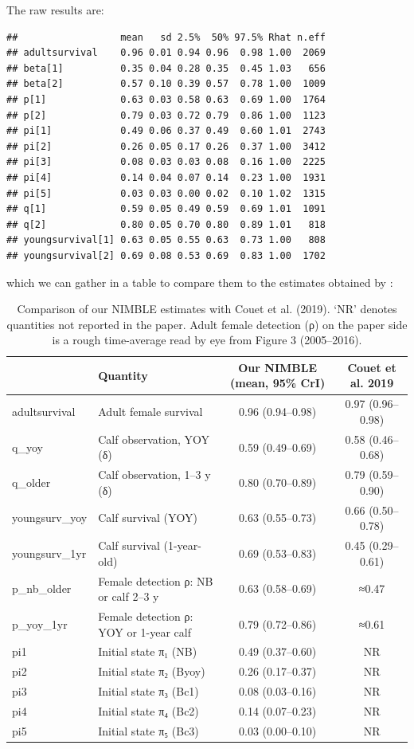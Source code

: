 \documentclass[
  12pt,
]{krantz}
\begin{document}
The raw results are:

\begin{verbatim}
##                  mean   sd 2.5%  50% 97.5% Rhat n.eff
## adultsurvival    0.96 0.01 0.94 0.96  0.98 1.00  2069
## beta[1]          0.35 0.04 0.28 0.35  0.45 1.03   656
## beta[2]          0.57 0.10 0.39 0.57  0.78 1.00  1009
## p[1]             0.63 0.03 0.58 0.63  0.69 1.00  1764
## p[2]             0.79 0.03 0.72 0.79  0.86 1.00  1123
## pi[1]            0.49 0.06 0.37 0.49  0.60 1.01  2743
## pi[2]            0.26 0.05 0.17 0.26  0.37 1.00  3412
## pi[3]            0.08 0.03 0.03 0.08  0.16 1.00  2225
## pi[4]            0.14 0.04 0.07 0.14  0.23 1.00  1931
## pi[5]            0.03 0.03 0.00 0.02  0.10 1.02  1315
## q[1]             0.59 0.05 0.49 0.59  0.69 1.01  1091
## q[2]             0.80 0.05 0.70 0.80  0.89 1.01   818
## youngsurvival[1] 0.63 0.05 0.55 0.63  0.73 1.00   808
## youngsurvival[2] 0.69 0.08 0.53 0.69  0.83 1.00  1702
\end{verbatim}

which we can gather in a table to compare them to the estimates obtained by \citet{couet2019}:

\begin{table}

\caption{\label{tab:unnamed-chunk-406}Comparison of our NIMBLE estimates with Couet et al. (2019). ‘NR’ denotes quantities not reported in the paper. Adult female detection (ρ) on the paper side is a rough time-average read by eye from Figure 3 (2005–2016).}
\centering
\begin{tabular}[t]{l|l|c|c}
\hline
  & Quantity & Our NIMBLE (mean, 95\% CrI) & Couet et al. 2019\\
\hline
adultsurvival & Adult female survival & 0.96 (0.94–0.98) & 0.97 (0.96–0.98)\\
\hline
q\_yoy & Calf observation, YOY (δ) & 0.59 (0.49–0.69) & 0.58 (0.46–0.68)\\
\hline
q\_older & Calf observation, 1–3 y (δ) & 0.80 (0.70–0.89) & 0.79 (0.59–0.90)\\
\hline
youngsurv\_yoy & Calf survival (YOY) & 0.63 (0.55–0.73) & 0.66 (0.50–0.78)\\
\hline
youngsurv\_1yr & Calf survival (1-year-old) & 0.69 (0.53–0.83) & 0.45 (0.29–0.61)\\
\hline
p\_nb\_older & Female detection ρ: NB or calf 2–3 y & 0.63 (0.58–0.69) & ≈0.47\\
\hline
p\_yoy\_1yr & Female detection ρ: YOY or 1-year calf & 0.79 (0.72–0.86) & ≈0.61\\
\hline
pi1 & Initial state π₁ (NB) & 0.49 (0.37–0.60) & NR\\
\hline
pi2 & Initial state π₂ (Byoy) & 0.26 (0.17–0.37) & NR\\
\hline
pi3 & Initial state π₃ (Bc1) & 0.08 (0.03–0.16) & NR\\
\hline
pi4 & Initial state π₄ (Bc2) & 0.14 (0.07–0.23) & NR\\
\hline
pi5 & Initial state π₅ (Bc3) & 0.03 (0.00–0.10) & NR\\
\hline
\end{tabular}
\end{table}
\end{document}
